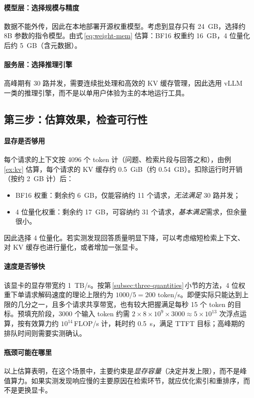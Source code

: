 \paragraph{模型层：选择规模与精度} 数据不能外传，因此在本地部署开源权重模型。考虑到显存只有 \SI{24}{GB}，选择约 8B 参数的指令模型。由式\,\eqref{eq:weight-mem} 估算：BF16 权重约 \SI{16}{GB}，4 位量化后约 \SI{5}{GB}（含元数据）。

\paragraph{服务层：选择推理引擎} 高峰期有 30 路并发，需要连续批处理和高效的 KV 缓存管理，因此选用 vLLM 一类的推理引擎，而不是以单用户体验为主的本地运行工具。

\subsection{第三步：估算效果，检查可行性}

\paragraph{显存是否够用} 每个请求的上下文按 4096 个 token 计（问题、检索片段与回答之和），由例\,\ref{ex:kv} 估算，每个请求的 KV 缓存约 \SI{0.5}{GiB}（约 \SI{0.54}{GB}）。扣除运行时开销（按约 \SI{2}{GB} 计）后：
\begin{itemize}
  \item BF16 权重：剩余约 \SI{6}{GB}，仅能容纳约 11 个请求，\emph{无法满足} 30 路并发；
  \item 4 位量化权重：剩余约 \SI{17}{GB}，可容纳约 31 个请求，\emph{基本满足}需求，但余量很小。
\end{itemize}
因此选择 4 位量化。若实测发现回答质量明显下降，可以考虑缩短检索上下文、对 KV 缓存也进行量化，或者增加一张显卡。

\paragraph{速度是否够快} 该显卡的显存带宽约 \SI{1}{TB/s}。按第\,\ref{subsec:three-quantities}\,小节的方法，4 位权重下单请求解码速度的理论上限约为 $1000/5=200$ token/s。即便实际只能达到上限的几分之一，且多个请求共享带宽，也有较大把握满足每秒 15 个 token 的目标。预填充阶段，3000 个输入 token 约需 $2\times8\times10^{9}\times3000\approx5\times10^{13}$ 次浮点运算，按有效算力约 $10^{14}$\,FLOP/s 计，耗时约 \SI{0.5}{s}，满足 TTFT 目标；高峰期的排队时间则需要实测确认。

\paragraph{瓶颈可能在哪里} 以上估算表明，在这个场景中，主要约束是\emph{显存容量}（决定并发上限），而不是峰值算力。如果实测发现响应慢的主要原因在检索环节，就应优化索引和重排序，而不是更换显卡。

